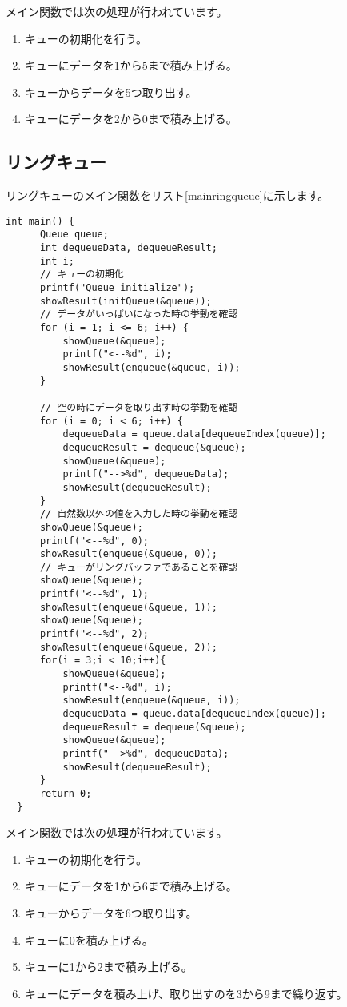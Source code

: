 \documentclass[a4j]{jarticle}
\begin{document}
メイン関数では次の処理が行われています。
\begin{enumerate}
  \item キューの初期化を行う。
  \item キューにデータを1から5まで積み上げる。
  \item キューからデータを5つ取り出す。
  \item キューにデータを2から0まで積み上げる。
\end{enumerate}

\subsection{リングキュー}
リングキューのメイン関数をリスト\ref{mainringqueue}に示します。

\begin{lstlisting}[caption=リングキューのメイン関数,label=mainringqueue]
  int main() {
      Queue queue;
      int dequeueData, dequeueResult;
      int i;
      // キューの初期化
      printf("Queue initialize");
      showResult(initQueue(&queue));
      // データがいっぱいになった時の挙動を確認
      for (i = 1; i <= 6; i++) {
          showQueue(&queue);
          printf("<--%d", i);
          showResult(enqueue(&queue, i));
      }

      // 空の時にデータを取り出す時の挙動を確認
      for (i = 0; i < 6; i++) {
          dequeueData = queue.data[dequeueIndex(queue)];
          dequeueResult = dequeue(&queue);
          showQueue(&queue);
          printf("-->%d", dequeueData);
          showResult(dequeueResult);
      }
      // 自然数以外の値を入力した時の挙動を確認
      showQueue(&queue);
      printf("<--%d", 0);
      showResult(enqueue(&queue, 0));
      // キューがリングバッファであることを確認
      showQueue(&queue);
      printf("<--%d", 1);
      showResult(enqueue(&queue, 1));
      showQueue(&queue);
      printf("<--%d", 2);
      showResult(enqueue(&queue, 2));
      for(i = 3;i < 10;i++){
          showQueue(&queue);
          printf("<--%d", i);
          showResult(enqueue(&queue, i));
          dequeueData = queue.data[dequeueIndex(queue)];
          dequeueResult = dequeue(&queue);
          showQueue(&queue);
          printf("-->%d", dequeueData);
          showResult(dequeueResult);
      }
      return 0;
  }
\end{lstlisting}

メイン関数では次の処理が行われています。
\begin{enumerate}
  \item キューの初期化を行う。
  \item キューにデータを1から6まで積み上げる。
  \item キューからデータを6つ取り出す。
  \item キューに0を積み上げる。
  \item キューに1から2まで積み上げる。
  \item キューにデータを積み上げ、取り出すのを3から9まで繰り返す。
\end{enumerate}
\end{document}
